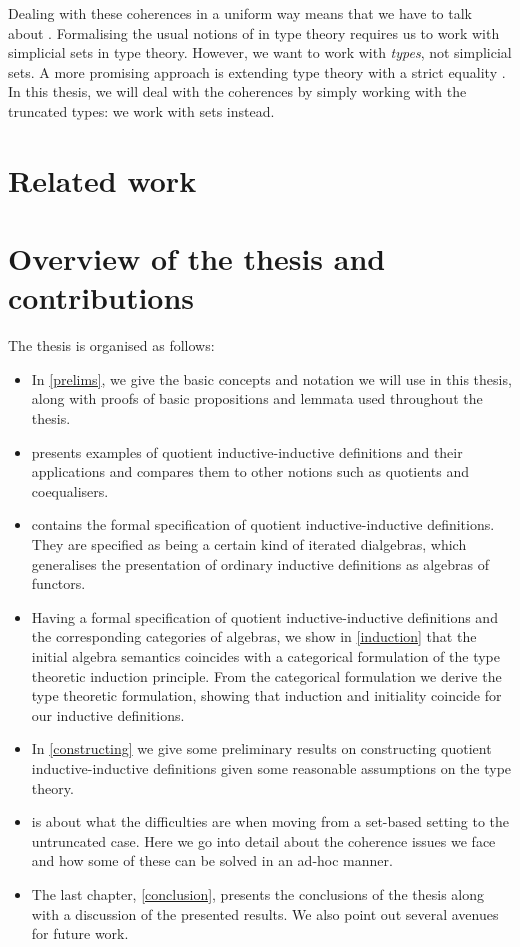 Dealing with these coherences in a uniform way means that we have to
talk about \inftycats \cite{Camarena2013}. Formalising the usual
notions of \inftycat in type theory requires us to work with
simplicial sets in type theory. However, we want to work with
\emph{types}, not simplicial sets. A more promising approach is
extending type theory with a strict equality
\cite{Altenkirch2016ii,Altenkirch2016iii}. In this thesis, we will
deal with the coherences by simply working with the truncated types:
we work with sets instead.

\section{Related work}


\section{Overview of the thesis and contributions}

The thesis is organised as follows:

\begin{itemize}
\item In \cref{prelims}, we give the basic concepts and notation we
  will use in this thesis, along with proofs of basic propositions and
  lemmata used throughout the thesis.
\item {} presents examples of quotient inductive-inductive
  definitions and their applications and compares them to other
  notions such as quotients and coequalisers.
\item {} contains the formal specification of quotient
  inductive-inductive definitions. They are specified as being a
  certain kind of iterated dialgebras, which generalises the
  presentation of ordinary inductive definitions as algebras of
  functors.
\item Having a formal specification of quotient inductive-inductive
  definitions and the corresponding categories of algebras, we show in
  \cref{induction} that the initial algebra semantics coincides with a
  categorical formulation of the type theoretic induction
  principle. From the categorical formulation we derive the type
  theoretic formulation, showing that induction and initiality
  coincide for our inductive definitions.
\item In \cref{constructing} we give some preliminary results on
  constructing quotient inductive-inductive definitions given some
  reasonable assumptions on the type theory.
\item {} is about what the difficulties are when
  moving from a set-based setting to the untruncated case. Here we go
  into detail about the coherence issues we face and how some of these
  can be solved in an ad-hoc manner.
\item The last chapter, \cref{conclusion}, presents the conclusions of
  the thesis along with a discussion of the presented results. We also
  point out several avenues for future work.
\end{itemize}

